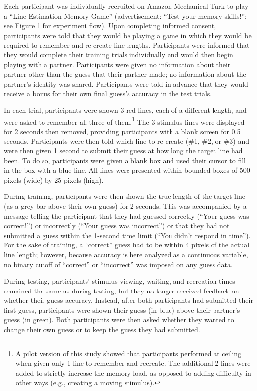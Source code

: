 \documentclass[10pt, letterpaper]{article}
\begin{document}
Each participant was individually recruited on Amazon Mechanical Turk to
play a ``Line Estimation Memory Game'' (advertisement: ``Test your
memory skills!''; see Figure 1 for experiment flow). Upon completing
informed consent, participants were told that they would be playing a
game in which they would be required to remember and re-create line
lengths. Participants were informed that they would complete their
training trials individually and would then begin playing with a
partner. Participants were given no information about their partner
other than the guess that their partner made; no information about the
partner's identity was shared. Participants were told in advance that
they would receive a bonus for their own final guess's accuracy in the
test trials.

In each trial, participants were shown 3 red lines, each of a different
length, and were asked to remember all three of
them.\footnote{A pilot version of this study showed that participants performed at ceiling when given only 1 line to remember and recreate. The additional 2 lines were added to strictly increase the memory load, as opposed to adding difficulty in other ways (e.g., creating a moving stimulus).}
The 3 stimulus lines were displayed for 2 seconds then removed,
providing participants with a blank screen for 0.5 seconds. Participants
were then told which line to re-create (\#1, \#2, or \#3) and were then
given 1 second to submit their guess at how long the target line had
been. To do so, participants were given a blank box and used their
cursor to fill in the box with a blue line. All lines were presented
within bounded boxes of 500 pixels (wide) by 25 pixels (high).

During training, participants were then shown the true length of the
target line (as a grey bar above their own guess) for 2 seconds. This
was accompanied by a message telling the participant that they had
guessed correctly (``Your guess was correct!'') or incorrectly (``Your
guess was incorrect'') or that they had not submitted a guess within the
1-second time limit (``You didn't respond in time''). For the sake of
training, a ``correct'' guess had to be within 4 pixels of the actual
line length; however, because accuracy is here analyzed as a continuous
variable, no binary cutoff of ``correct'' or ``incorrect'' was imposed
on any guess data.

During testing, participants' stimulus viewing, waiting, and recreation
times remained the same as during testing, but they no longer received
feedback on whether their guess accuracy. Instead, after both
participants had submitted their first guess, participants were shown
their guess (in blue) above their partner's guess (in green). Both
participants were then asked whether they wanted to change their own
guess or to keep the guess they had submitted.
\end{document}

